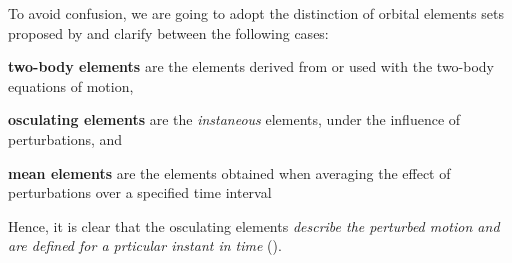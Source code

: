 To avoid confusion, we are going to adopt the distinction of orbital elements 
sets proposed by \cite{Vallado} and clarify between the following cases:
\begin{description}
  \item \textbf{two-body elements} are the elements derived from or used with 
    the two-body equations of motion,
  \item \textbf{osculating elements} are the \emph{instaneous} elements, under 
    the influence of perturbations, and
  \item \textbf{mean elements} are the elements obtained when averaging the 
    effect of perturbations over a specified time interval
\end{description}

Hence, it is clear that the osculating elements \emph{describe the perturbed 
motion and are defined for a prticular instant in time} (\cite{Vallado}).
